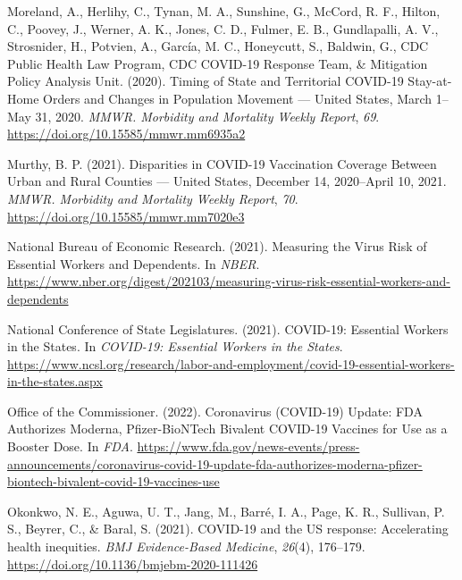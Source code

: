 \documentclass[
]{article}
\newlength{\cslhangindent}
\newlength{\cslentryspacingunit} %
\newenvironment{CSLReferences}[2] %
 {%
  \setlength{\parindent}{0pt}
  \ifodd #1
  \let\oldpar\par
  \def\par{\hangindent=\cslhangindent\oldpar}
  \fi
  \setlength{\parskip}{#2\cslentryspacingunit}
 }%
 {}
\begin{document}
\begin{CSLReferences}{1}{0}
\leavevmode{}%
Moreland, A., Herlihy, C., Tynan, M. A., Sunshine, G., McCord, R. F., Hilton, C., Poovey, J., Werner, A. K., Jones, C. D., Fulmer, E. B., Gundlapalli, A. V., Strosnider, H., Potvien, A., García, M. C., Honeycutt, S., Baldwin, G., CDC Public Health Law Program, CDC COVID-19 Response Team, \& Mitigation Policy Analysis Unit. (2020). Timing of {State} and {Territorial} {COVID}-19 {Stay}-at-{Home} {Orders} and {Changes} in {Population} {Movement} --- {United} {States}, {March} 1--{May} 31, 2020. \emph{MMWR. Morbidity and Mortality Weekly Report}, \emph{69}. \url{https://doi.org/10.15585/mmwr.mm6935a2}

\leavevmode{}%
Murthy, B. P. (2021). Disparities in {COVID}-19 {Vaccination} {Coverage} {Between} {Urban} and {Rural} {Counties} --- {United} {States}, {December} 14, 2020--{April} 10, 2021. \emph{MMWR. Morbidity and Mortality Weekly Report}, \emph{70}. \url{https://doi.org/10.15585/mmwr.mm7020e3}

\leavevmode{}%
National Bureau of Economic Research. (2021). Measuring the {Virus} {Risk} of {Essential} {Workers} and {Dependents}. In \emph{NBER}. \url{https://www.nber.org/digest/202103/measuring-virus-risk-essential-workers-and-dependents}

\leavevmode{}%
National Conference of State Legislatures. (2021). {COVID}-19: {Essential} {Workers} in the {States}. In \emph{COVID-19: Essential Workers in the States}. \url{https://www.ncsl.org/research/labor-and-employment/covid-19-essential-workers-in-the-states.aspx}

\leavevmode{}%
Office of the Commissioner. (2022). Coronavirus ({COVID}-19) {Update}: {FDA} {Authorizes} {Moderna}, {Pfizer}-{BioNTech} {Bivalent} {COVID}-19 {Vaccines} for {Use} as a {Booster} {Dose}. In \emph{FDA}. \url{https://www.fda.gov/news-events/press-announcements/coronavirus-covid-19-update-fda-authorizes-moderna-pfizer-biontech-bivalent-covid-19-vaccines-use}

\leavevmode{}%
Okonkwo, N. E., Aguwa, U. T., Jang, M., Barré, I. A., Page, K. R., Sullivan, P. S., Beyrer, C., \& Baral, S. (2021). {COVID}-19 and the {US} response: Accelerating health inequities. \emph{BMJ Evidence-Based Medicine}, \emph{26}(4), 176--179. \url{https://doi.org/10.1136/bmjebm-2020-111426}


\end{CSLReferences}
\end{document}
